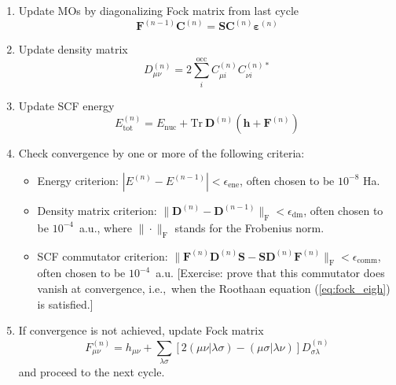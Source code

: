 \documentclass[parskip=full]{article}
\begin{document}
\begin{enumerate}
\begin{enumerate}
            \item Update MOs by diagonalizing Fock matrix from last cycle
            \begin{equation}    \label{eq:fock_eigh}
                \mathbf{F}^{(n-1)} \mathbf{C}^{(n)}
                    = \mathbf{S} \mathbf{C}^{(n)} \bm{\varepsilon}^{(n)}
            \end{equation}
            \item Update density matrix
            \begin{equation}
                D^{(n)}_{\mu\nu}
                    = 2 \sum_{i}^{\textrm{occ}} C^{(n)}_{\mu i} C^{(n)*}_{\nu i}
            \end{equation}
            \item Update SCF energy
            \begin{equation}    \label{eq:scf_energy}
                E^{(n)}_{\textrm{tot}}
                    = E_{\textrm{nuc}} + \mathrm{Tr}~\mathbf{D}^{(n)} (\mathbf{h} + \mathbf{F}^{(n)})
            \end{equation}
            \item Check convergence by one or more of the following criteria:
            \begin{itemize}
                \item Energy criterion: $|E^{(n)} - E^{(n-1)}| < \epsilon_{\textrm{ene}}$, often chosen to be $10^{-8}$ Ha.
                \item Density matrix criterion: $\|\mathbf{D}^{(n)} - \mathbf{D}^{(n-1)}\|_{\textrm{F}} < \epsilon_{\textrm{dm}}$, often chosen to be $10^{-4}$~a.u., where $\|\cdot\|_{\textrm{F}}$ stands for the Frobenius norm.
                \item SCF commutator criterion: $\|\mathbf{F}^{(n)}\mathbf{D}^{(n)}\mathbf{S} - \mathbf{S}\mathbf{D}^{(n)}\mathbf{F}^{(n)}\|_{\textrm{F}} < \epsilon_{\textrm{comm}}$, often chosen to be $10^{-4}$~a.u.
                [Exercise: prove that this commutator does vanish at convergence, i.e.,~when the Roothaan equation (\ref{eq:fock_eigh}) is satisfied.]
            \end{itemize}
            \item If convergence is not achieved, update Fock matrix
            \begin{equation}    \label{eq:fock_build}
                F^{(n)}_{\mu\nu}
                    = h_{\mu\nu} + \sum_{\lambda\sigma} [2 (\mu\nu|\lambda\sigma) - (\mu\sigma|\lambda\nu)] D^{(n)}_{\sigma\lambda}
            \end{equation}
            and proceed to the next cycle.
        \end{enumerate}
    \end{enumerate}
\end{document}

